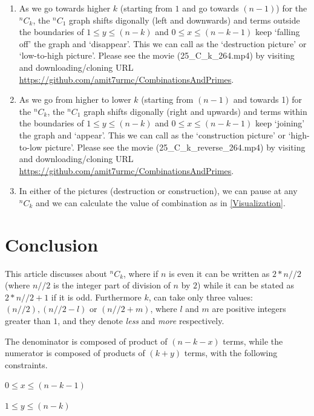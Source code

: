 \documentclass[10pt, twoside]{article}
\newcommand*{\Combination}[2]{{}^{#1}C_{#2}}%
\begin{document}
\begin{enumerate}
	\item As we go towards higher $k$ (starting from $1$ and go towards $(n-1)$) for the $\Combination{n}{k}$, the $\Combination{n}{1}$ graph shifts digonally (left and downwards) and terms outside the boundaries of $ 1 \leq y \leq (n-k)$ and $0 \leq x \leq (n-k-1)$ keep `falling off' the graph and `disappear'. This we can call as the `destruction picture' or `low-to-high picture'. Please see the movie (25\_C\_k\_264.mp4) by visiting and downloading/cloning URL \url{https://github.com/amit7urmc/CombinationsAndPrimes}.
	\item As we go from higher to lower $k$ (starting from $(n-1)$ and towards 1) for the $\Combination{n}{k}$, the $\Combination{n}{1}$ graph shifts digonally (right and upwards) and terms within the boundaries of $ 1 \leq y \leq (n-k)$ and $0 \leq x \leq (n-k-1)$ keep `joining' the graph and `appear'. This we can call as the `construction picture' or `high-to-low picture'. Please see the movie (25\_C\_k\_reverse\_264.mp4) by visiting and downloading/cloning URL \url{https://github.com/amit7urmc/CombinationsAndPrimes}.
	\item In either of the pictures (destruction or construction), we can pause at any $\Combination{n}{k}$ and we can calculate the value of combination as in \ref{Visualization}.
	\end{enumerate} 
\section{Conclusion}\label{Summary}
This article discusses about $\Combination{n}{k}$, where if $n$ is even it can be written as $2*n//2$ (where $n//2$ is the integer part of division of $n$ by $2$) while it can be stated as $2*n//2+1$ if it is odd. Furthermore $k$, can take only three values: $(n//2), (n//2 - l) \text{ or } (n//2 + m)$, where $l$ and $m$ are positive integers greater than $1$, and they denote \textit{less} and \textit{more} respectively.

The denominator is composed of product of $(n-k-x)$ terms, while the numerator is composed of products of $(k+y)$ terms, with the following constraints.

$0 \leq x \leq (n-k-1)$

$1 \leq y \leq (n-k)$
\end{document}
